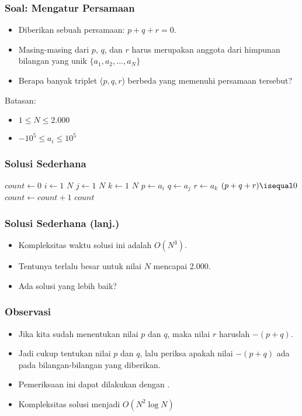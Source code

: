 \begin{frame}
\frametitle{Soal: Mengatur Persamaan}
\begin{itemize}
  \item Diberikan sebuah persamaan: $p + q + r = 0$.
  \item Masing-masing dari $p$, $q$, dan $r$ harus merupakan anggota dari himpunan bilangan yang unik $\{ a_1, a_2, ..., a_N \}$
  \item Berapa banyak triplet ($p, q, r$) berbeda yang memenuhi persamaan tersebut?
\end{itemize}

Batasan:
\begin{itemize} 
  \item $1 \leq N \leq 2.000$
  \item $-10^5 \leq a_i \leq 10^5$
\end{itemize}
\end{frame}

\begin{frame}
\frametitle{Solusi Sederhana}

\begin{codebox}
\li $count \gets 0$
\li \For $i \gets 1$ \To $N$ \Do
\li   \For $j \gets 1$ \To $N$ \Do
\li     \For $k \gets 1$ \To $N$ \Do
\li       $p \gets a_i$
\li       $q \gets a_j$
\li       $r \gets a_k$
\li       \If $(p + q + r) \isequal 0$ \Then
\li         $count \gets count + 1$
          \End
        \End
      \End
    \End
\li \Return $count$
\end{codebox}
\end{frame}

\begin{frame}
\frametitle{Solusi Sederhana (lanj.)}
\begin{itemize}
  \item Kompleksitas waktu solusi ini adalah $O(N^3)$.
  \item Tentunya terlalu besar untuk nilai $N$ mencapai 2.000.
  \item Ada solusi yang lebih baik?
\end{itemize}
\end{frame}

\begin{frame}
\frametitle{Observasi}
\begin{itemize}
  \item Jika kita sudah menentukan nilai $p$ dan $q$, maka nilai $r$ haruslah $-(p + q)$.
  \item Jadi cukup tentukan nilai $p$ dan $q$, lalu periksa apakah nilai $-(p + q)$ ada pada bilangan-bilangan yang diberikan.
  \item Pemeriksaan ini dapat dilakukan dengan \fBinarySearch.
  \item Kompleksitas solusi menjadi $O(N^2 \log{N})$
\end{itemize}
\end{frame}

